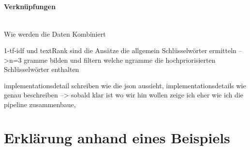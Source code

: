 \paragraph{Verknüpfungen}\mbox{}\\
Wie werden die Daten Kombiniert

1-tf-idf und textRank sind die Ansätze die allgemein Schlüsselwörter ermitteln
-->n=3 gramme bilden und filtern welche ngramme die hochpriorisierten Schlüsselwörter enthalten


implementationsdetail schreiben wie die json aussieht, implementationsdetails wie genau beschreiben --> sobald klar ist wo wir hin wollen zeige ich eher wie ich die pipeline zusammenbaue,

\section{Erklärung anhand eines Beispiels}
